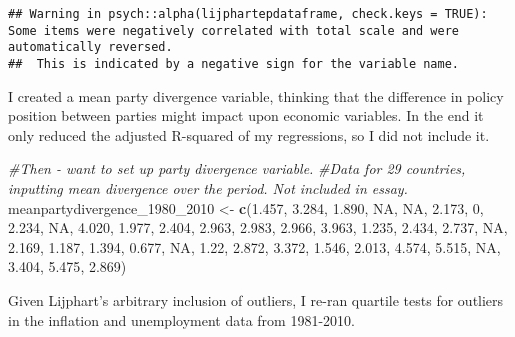 \documentclass[]{article}
\newenvironment{Shaded}{\begin{snugshade}}{\end{snugshade}}
\newcommand{\CommentTok}[1]{\textcolor[rgb]{0.56,0.35,0.01}{\textit{#1}}}
\newcommand{\DataTypeTok}[1]{\textcolor[rgb]{0.13,0.29,0.53}{#1}}
\newcommand{\DecValTok}[1]{\textcolor[rgb]{0.00,0.00,0.81}{#1}}
\newcommand{\FloatTok}[1]{\textcolor[rgb]{0.00,0.00,0.81}{#1}}
\newcommand{\KeywordTok}[1]{\textcolor[rgb]{0.13,0.29,0.53}{\textbf{#1}}}
\newcommand{\NormalTok}[1]{#1}
\newcommand{\OperatorTok}[1]{\textcolor[rgb]{0.81,0.36,0.00}{\textbf{#1}}}
\newcommand{\OtherTok}[1]{\textcolor[rgb]{0.56,0.35,0.01}{#1}}
\newcommand{\StringTok}[1]{\textcolor[rgb]{0.31,0.60,0.02}{#1}}
\begin{document}
\begin{verbatim}
## Warning in psych::alpha(lijphartepdataframe, check.keys = TRUE): Some items were negatively correlated with total scale and were automatically reversed.
##  This is indicated by a negative sign for the variable name.
\end{verbatim}

I created a mean party divergence variable, thinking that the difference
in policy position between parties might impact upon economic variables.
In the end it only reduced the adjusted R-squared of my regressions, so
I did not include it.

\begin{Shaded}
\begin{Highlighting}[]
\CommentTok{#Then - want to set up party divergence variable. }
\CommentTok{#Data for 29 countries, inputting mean divergence over the period. Not included in essay.}
\NormalTok{meanpartydivergence_}\DecValTok{1980}\NormalTok{_}\DecValTok{2010}\NormalTok{ <-}\StringTok{ }\KeywordTok{c}\NormalTok{(}\FloatTok{1.457}\NormalTok{, }\FloatTok{3.284}\NormalTok{, }\FloatTok{1.890}\NormalTok{, }\OtherTok{NA}\NormalTok{, }\OtherTok{NA}\NormalTok{, }\FloatTok{2.173}\NormalTok{, }\DecValTok{0}\NormalTok{, }\FloatTok{2.234}\NormalTok{, }\OtherTok{NA}\NormalTok{, }\FloatTok{4.020}\NormalTok{, }\FloatTok{1.977}\NormalTok{,}
                                   \FloatTok{2.404}\NormalTok{, }\FloatTok{2.963}\NormalTok{, }\FloatTok{2.983}\NormalTok{, }\FloatTok{2.966}\NormalTok{, }\FloatTok{3.963}\NormalTok{, }\FloatTok{1.235}\NormalTok{, }\FloatTok{2.434}\NormalTok{, }\FloatTok{2.737}\NormalTok{, }\OtherTok{NA}\NormalTok{, }\FloatTok{2.169}\NormalTok{,}
                                   \FloatTok{1.187}\NormalTok{, }\FloatTok{1.394}\NormalTok{, }\FloatTok{0.677}\NormalTok{, }\OtherTok{NA}\NormalTok{, }\FloatTok{1.22}\NormalTok{, }\FloatTok{2.872}\NormalTok{, }\FloatTok{3.372}\NormalTok{, }\FloatTok{1.546}\NormalTok{, }\FloatTok{2.013}\NormalTok{, }\FloatTok{4.574}\NormalTok{,}
                                   \FloatTok{5.515}\NormalTok{, }\OtherTok{NA}\NormalTok{, }\FloatTok{3.404}\NormalTok{, }\FloatTok{5.475}\NormalTok{, }\FloatTok{2.869}\NormalTok{)}
\end{Highlighting}
\end{Shaded}

Given Lijphart's arbitrary inclusion of outliers, I re-ran quartile
tests for outliers in the inflation and unemployment data from
1981-2010.

\begin{Shaded}
\end{Shaded}
\end{document}
